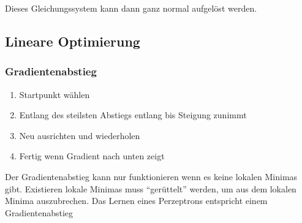 Dieses Gleichungssystem kann dann ganz normal aufgelöst werden.

\subsection{Lineare Optimierung}
\subsubsection{Gradientenabstieg} \label{2_Gradientenabstieg}
\begin{enumerate}
	\item Startpunkt wählen
	\item Entlang des steilsten Abstiegs entlang bis Steigung zunimmt
	\item Neu ausrichten und wiederholen
	\item Fertig wenn Gradient nach unten zeigt
\end{enumerate}
Der Gradientenabstieg kann nur funktionieren wenn es keine lokalen
Minimas gibt. Existieren lokale Minimas muss ``gerüttelt'' werden, um
aus dem lokalen Minima auszubrechen.
Das Lernen eines Perzeptrons entspricht einem Gradientenabstieg
